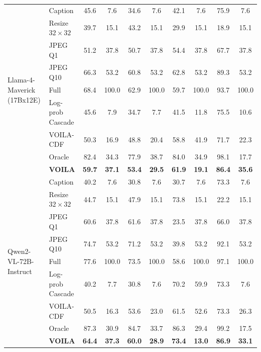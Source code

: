 \begin{table}[htbp]
{\begin{tabular}{llcccccccc}
\multirow{9}{*}{Llama-4-Maverick (17Bx12E)}
& Caption              & 45.6 & 7.6   & 34.6 & 7.6   & 42.1 & 7.6   & 75.9 & 7.6   \\
& Resize $32{\times}32$& 39.7 & 15.1  & 43.2 & 15.1  & 29.9 & 15.1  & 18.9 & 15.1  \\
& JPEG Q1              & 51.2 & 37.8  & 50.7 & 37.8  & 54.4 & 37.8  & 67.7 & 37.8  \\
& JPEG Q10             & 66.3 & 53.2  & 60.8 & 53.2  & 62.8 & 53.2  & 89.3 & 53.2  \\
& Full                 & 68.4 & 100.0 & 62.9 & 100.0 & 59.7 & 100.0 & 93.7 & 100.0 \\
& Log-prob Cascade     & 45.6 & 7.9   & 34.7 & 7.7   & 41.5 & 11.8  & 75.5 & 10.6  \\
& \textsc{VOILA}-CDF   & 50.3 & 16.9  & 48.8 & 20.4  & 58.8 & 41.9  & 71.7 & 22.3  \\
& Oracle               & 82.4 & 34.3  & 77.9 & 38.7  & 84.0 & 34.9  & 98.1 & 17.7  \\
& \textbf{\textsc{VOILA}} & \textbf{59.7} & \textbf{37.1} & \textbf{53.4} & \textbf{29.5} & \textbf{61.9} & \textbf{19.1} & \textbf{86.4} & \textbf{35.6} \\
\midrule

\multirow{9}{*}{Qwen2-VL-72B-Instruct}
& Caption              & 40.2 & 7.6   & 30.8 & 7.6   & 30.7 & 7.6   & 73.3 & 7.6   \\
& Resize $32{\times}32$& 44.7 & 15.1  & 47.9 & 15.1  & 73.8 & 15.1  & 22.2 & 15.1  \\
& JPEG Q1              & 60.6 & 37.8  & 61.6 & 37.8  & 23.5 & 37.8  & 66.0 & 37.8  \\
& JPEG Q10             & 74.7 & 53.2  & 71.2 & 53.2  & 39.8 & 53.2  & 92.1 & 53.2  \\
& Full                 & 77.6 & 100.0 & 73.5 & 100.0 & 58.6 & 100.0 & 97.1 & 100.0 \\
& Log-prob Cascade     & 40.2 & 7.7   & 30.8 & 7.6   & 70.2 & 59.9  & 73.3 & 7.6   \\
& \textsc{VOILA}-CDF   & 50.5 & 16.3  & 53.6 & 23.0  & 61.5 & 52.6  & 73.3 & 26.3  \\
& Oracle               & 87.3 & 30.9  & 84.7 & 33.7  & 86.3 & 29.4  & 99.2 & 17.5  \\
& \textbf{\textsc{VOILA}} & \textbf{64.4} & \textbf{37.3} & \textbf{60.0} & \textbf{28.9} & \textbf{73.4} & \textbf{13.0} & \textbf{86.9} & \textbf{33.1} \\
\midrule


\end{tabular}}
\end{table}
